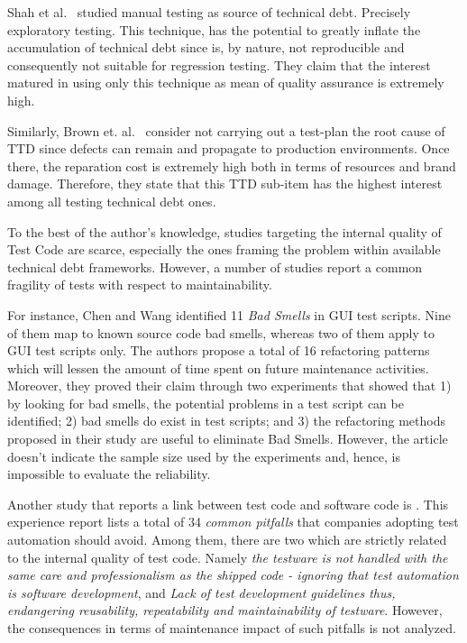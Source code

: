 Shah et al.\ \cite{exploratorying_testing_td} studied manual testing as source of technical debt. Precisely exploratory testing. This technique, has the potential to greatly inflate the accumulation of technical debt since is, by nature, not reproducible and consequently not suitable for regression testing. They claim that the interest matured in using only this technique as mean of quality assurance is extremely high. 

Similarly, Brown et. al.\ \cite{td_current_vs_optimal_quality} consider not carrying out a test-plan the root cause of TTD since defects can remain and propagate to production environments. Once there, the reparation cost is extremely high both in terms of resources and brand damage. Therefore, they state that this TTD sub-item has the highest interest among all testing technical debt ones.

To the best of the author's knowledge, studies targeting the internal quality of Test Code are scarce, especially the ones framing the problem within available technical debt frameworks. However, a number of studies report a common fragility of tests with respect to maintainability. 

For instance, Chen and Wang \cite{gui_scripts_bad_smells} identified 11 \textit{Bad Smells} in GUI test scripts. Nine of them map to known source code bad smells, whereas two of them apply to GUI test scripts only. The authors propose a total of 16 refactoring patterns which will lessen the amount of time spent on future maintenance activities. Moreover, they proved their claim through two experiments that showed that 1) by looking for bad smells, the potential problems in a test script can be identified; 2) bad smells do exist in test scripts; and 3) the refactoring methods proposed in their study are useful to eliminate Bad Smells. However, the article doesn't indicate the sample size used by the experiments and, hence, is impossible to evaluate the reliability. 

Another study that reports a link between test code and software code is \cite{pitfalls_in_introducing_regression_testing}. This experience report lists a total of 34 \textit{common pitfalls} that companies adopting test automation should avoid. Among them, there are two which are strictly related to the internal quality of test code. Namely \textit{the testware is not handled with the same care and professionalism as the shipped code - ignoring that test automation is software development}, and \textit{Lack of test development guidelines thus, endangering reusability, repeatability and maintainability of testware}. However, the consequences in terms of maintenance impact of such pitfalls is not analyzed. 

